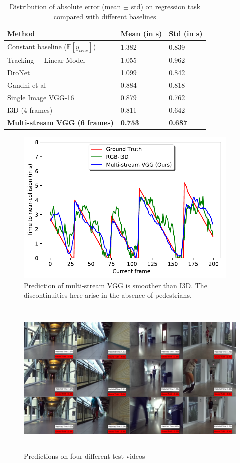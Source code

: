 \begin{table}[ht]
\caption {Distribution of absolute error (mean $\pm$ std) on regression task compared with different baselines} \label{tab:baselines} 
\begin{tabular}{|P{6cm}|P{3cm}|P{2.25cm}|} \hline
Method  &  Mean (in s) & Std (in s)\\ \hline
Constant baseline ($\mathbb{E}[y_{true}]$) & 1.382 & 0.839\\ \hline 
Tracking + Linear Model \cite{BBeep} &  1.055  & 0.962 \\ \hline 
DroNet \cite{DroNet} & 1.099 &  0.842  \\ \hline 
Gandhi et al \cite{gandhi} & 0.884 & 0.818 \\ \hline
Single Image VGG-16 & 0.879  & 0.762 \\ \hline
I3D (4 frames) \cite{i3d} & 0.811  & 0.642  \\ \hline
\textbf{Multi-stream VGG (6 frames)} & \textbf{0.753}  & \textbf{0.687}  \\ \hline 
\end{tabular}
\end{table}

  \begin{figure}[ht]
      \centering
      \includegraphics[height=7.5cm, width=\textwidth]{figs/400_new.pdf}
      \caption{Prediction of multi-stream VGG is smoother than I3D. The discontinuities here arise in the absence of pedestrians.}
      \label{fig:plot}
  \end{figure}
  
    \begin{figure}[ht]
      \centering
      \includegraphics[height=7.5cm, width=\textwidth]{figs/qr2.pdf}
      \caption{Predictions on four different test videos}
      \label{fig:testVideos}
  \end{figure}


